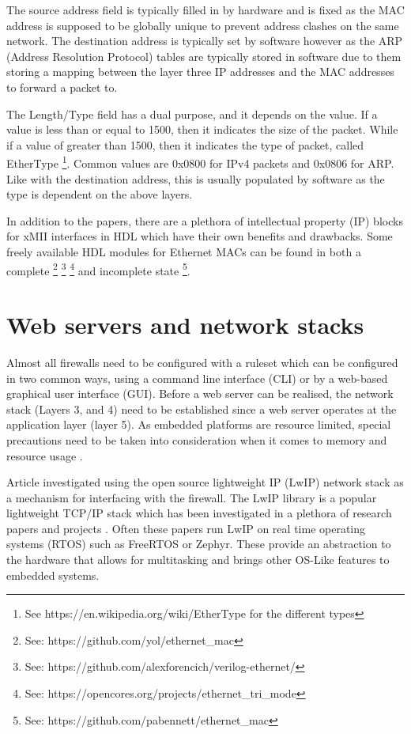 The source address field is typically filled in by hardware and is fixed as the MAC address is supposed to be globally unique to prevent address clashes on the same network. The destination address is typically set by software however as the ARP (Address Resolution Protocol) tables are typically stored in software due to them storing a mapping between the layer three IP addresses and the MAC addresses to forward a packet to. 

The Length/Type field has a dual purpose, and it depends on the value. If a value is less than or equal to 1500, then it indicates the size of the packet. While if a value of greater than 1500, then it indicates the type of packet, called EtherType \footnote[1]{See https://en.wikipedia.org/wiki/EtherType for the different types}. Common values are 0x0800 for IPv4 packets and 0x0806 for ARP. Like with the destination address, this is usually populated by software as the type is dependent on the above layers.


In addition to the papers, there are a plethora of intellectual property (IP) blocks for xMII interfaces in HDL 
which have their own benefits and drawbacks. Some freely available HDL modules for Ethernet MACs can be found in both a complete \footnote[2]{See: https://github.com/yol/ethernet\_mac} \footnote[3]{See: https://github.com/alexforencich/verilog-ethernet/} 
\footnote[4]{See: https://opencores.org/projects/ethernet\_tri\_mode} and incomplete state
\footnote[5]{See: https://github.com/pabennett/ethernet\_mac}.








\section{Web servers and network stacks}



Almost all firewalls need to be configured with a ruleset which can be configured in two common ways, using a command line interface (CLI) 
or by a web-based graphical user interface (GUI). Before a web server can be realised, the network stack (Layers 3, and 4) need to be established since a web server operates at the application layer (layer 5). As embedded platforms are resource limited, special precautions need to be taken into consideration when it comes to memory and resource usage \cite{OptimCortexLwIP}.

Article \cite{LwIPFPGAFirewall} investigated using the open source lightweight IP (LwIP) network stack as a mechanism for interfacing with the firewall. 
The LwIP library is a popular lightweight TCP/IP stack which has been investigated in a plethora of research papers and projects \cite{ImprovemntOptimLWIP} 
\cite{OptimCortexLwIP}. Often these papers run LwIP on real time operating systems (RTOS) such as FreeRTOS or Zephyr. These provide an abstraction to the hardware that allows for multitasking and brings other OS-Like features to embedded systems. 

